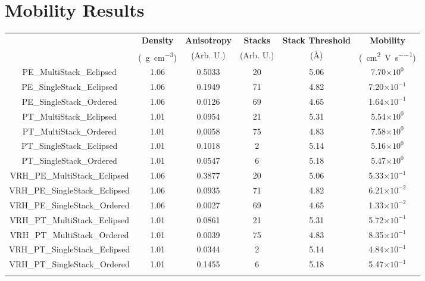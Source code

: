 \documentclass[12pt]{article}
\def\mobunits{\square\centi\meter\per\volt\per\second}
\def\gcm{\gram\per\cubic\centi\meter}
\def\ccg{\cellcolor{gray}}
\begin{document}
\section{Mobility Results}


\begin{center}
\begin{adjustbox}{max width = \textwidth}
\begin{tabular}{| c | c | c | c | c | c |}
\hline
\rule{0pt}{2.5ex}
\multirow{2}{*}{\textbf{Simulation Name}}&\textbf{Density}&\textbf{Anisotropy}&\textbf{Stacks}&\textbf{Stack Threshold}&\textbf{Mobility}\\
                            &(\SI{}{\gcm})&(Arb. U.)&(Arb. U.)&(\AA)&(\SI{}{\mobunits})\\
\hhline{|======|}
{\ccg}\rule{0pt}{2.5ex}PE\_MultiStack\_Eclipsed&{\ccg}1.06&{\ccg}0.5033&{\ccg}20&{\ccg}5.06&{\ccg}7.70$\times10^{0}$\\
\rule{0pt}{2.5ex}PE\_SingleStack\_Eclipsed&1.06&0.1949&71&4.82&7.20$\times10^{-1}$\\
{\ccg}\rule{0pt}{2.5ex}PE\_SingleStack\_Ordered&{\ccg}1.06&{\ccg}0.0126&{\ccg}69&{\ccg}4.65&{\ccg}1.64$\times10^{-1}$\\
\hhline{------}
\rule{0pt}{2.5ex}PT\_MultiStack\_Eclipsed&1.01&0.0954&21&5.31&5.54$\times10^{0}$\\
{\ccg}\rule{0pt}{2.5ex}PT\_MultiStack\_Ordered&{\ccg}1.01&{\ccg}0.0058&{\ccg}75&{\ccg}4.83&{\ccg}7.58$\times10^{0}$\\
\rule{0pt}{2.5ex}PT\_SingleStack\_Eclipsed&1.01&0.1018&2&5.14&5.16$\times10^{0}$\\
{\ccg}\rule{0pt}{2.5ex}PT\_SingleStack\_Ordered&{\ccg}1.01&{\ccg}0.0547&{\ccg}6&{\ccg}5.18&{\ccg}5.47$\times10^{0}$\\
\hhline{|======|}
\rule{0pt}{2.5ex}VRH\_PE\_MultiStack\_Eclipsed&1.06&0.3877&20&5.06&5.33$\times10^{-1}$\\
{\ccg}\rule{0pt}{2.5ex}VRH\_PE\_SingleStack\_Eclipsed&{\ccg}1.06&{\ccg}0.0935&{\ccg}71&{\ccg}4.82&{\ccg}6.21$\times10^{-2}$\\
\rule{0pt}{2.5ex}VRH\_PE\_SingleStack\_Ordered&1.06&0.0027&69&4.65&1.33$\times10^{-2}$\\
\hhline{------}
{\ccg}\rule{0pt}{2.5ex}VRH\_PT\_MultiStack\_Eclipsed&{\ccg}1.01&{\ccg}0.0861&{\ccg}21&{\ccg}5.31&{\ccg}5.72$\times10^{-1}$\\
\rule{0pt}{2.5ex}VRH\_PT\_MultiStack\_Ordered&1.01&0.0039&75&4.83&8.35$\times10^{-1}$\\
{\ccg}\rule{0pt}{2.5ex}VRH\_PT\_SingleStack\_Eclipsed&{\ccg}1.01&{\ccg}0.0344&{\ccg}2&{\ccg}5.14&{\ccg}4.84$\times10^{-1}$\\
\rule{0pt}{2.5ex}VRH\_PT\_SingleStack\_Ordered&1.01&0.1455&6&5.18&5.47$\times10^{-1}$\\
\hhline{------}
\end{tabular}\label{table:mob}
\end{adjustbox}
\end{center}
\end{document}
